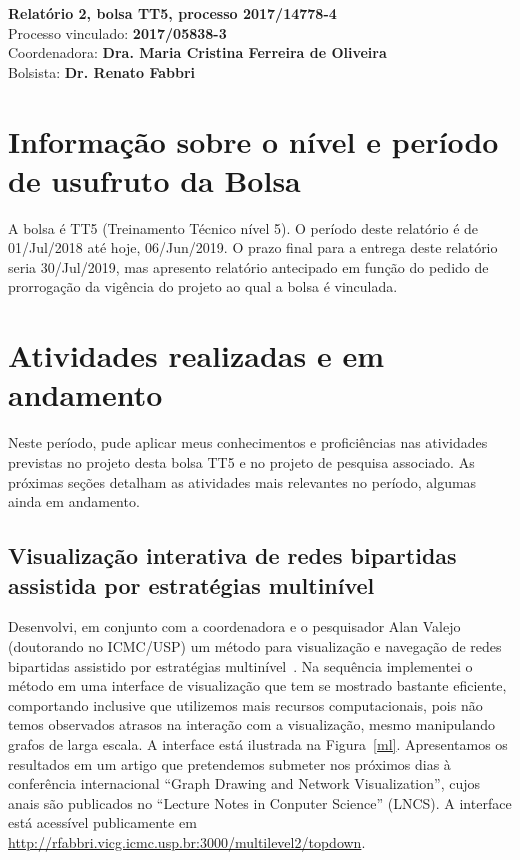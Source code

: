 \documentclass[a4paper, 11pt]{article}
\begin{document}
\noindent
\normalsize
 \textbf{Relatório 2, bolsa TT5, processo 2017/14778-4}\\
Processo vinculado: \textbf{2017/05838-3} \\
Coordenadora: \textbf{Dra. Maria Cristina Ferreira de Oliveira} \\
Bolsista: \textbf{Dr. Renato Fabbri} \\

\section{Informação sobre o nível e período de usufruto da Bolsa}
A bolsa é TT5 (Treinamento Técnico nível 5).
O período deste relatório é de 01/Jul/2018 até hoje, 06/Jun/2019.
O prazo final para a entrega deste relatório seria 30/Jul/2019, mas apresento relatório antecipado em função do pedido de prorrogação
da vigência do projeto ao qual a bolsa é vinculada.

\section{Atividades realizadas e em andamento}\label{desc}
Neste período, pude aplicar meus conhecimentos e proficiências nas atividades previstas no projeto desta bolsa TT5 e no projeto de pesquisa associado. As próximas seções detalham as atividades mais relevantes no período, algumas ainda em andamento.

\subsection{Visualização interativa de redes bipartidas assistida por estratégias multinível}\label{sml}
Desenvolvi, em conjunto com a coordenadora e o pesquisador Alan Valejo (doutorando no ICMC/USP) um método para visualização e navegação de redes bipartidas assistido por estratégias multinível~\cite{alan}.
    Na sequência implementei o método em uma interface de visualização que tem se mostrado bastante eficiente, comportando inclusive que utilizemos mais recursos computacionais, pois não temos observados atrasos na interação com a visualização, mesmo manipulando grafos de larga escala.
    A interface está ilustrada na Figura~\ref{ml}. %
    Apresentamos os resultados em um artigo que pretendemos submeter nos próximos dias à conferência internacional ``Graph Drawing and Network Visualization'', cujos anais são publicados no ``Lecture Notes in Conputer Science'' (LNCS).
    A interface está acessível  publicamente em \url{http://rfabbri.vicg.icmc.usp.br:3000/multilevel2/topdown}.
\end{document}
